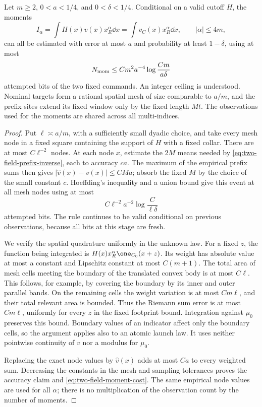 \begin{lemma}
\label{lem:two-field-finite-moments}
Let $m\ge2$, $0<a<1/4$, and $0<\delta<1/4$.  Conditional on a
valid cutoff $H$, the moments
\[
 I_\alpha=\int H(x)v(x)x_R^\alpha\dd x
          =\int v_C(x)x_R^\alpha\dd x,
                    \qquad |\alpha|\le4m,
\]
can all be estimated with error at most $a$ and probability at least
$1-\delta$, using at most
\begin{equation}\label{eq:two-field-moment-cost}
 N_{\rm mom}\le C m^2a^{-4}
                    \log\frac{Cm}{a\delta}
\end{equation}
attempted bits of the two fixed commands.  An integer ceiling is
understood.  Nominal targets form a rational spatial mesh of size
comparable to $a/m$, and the prefix sites extend its fixed window
only by the fixed length $Mt$.  The observations used for the
moments are shared across all multi-indices.
\end{lemma}
\begin{proof}
Put $\ell\asymp a/m$, with a sufficiently small dyadic choice,
and take every mesh node in a fixed square containing the support
of $H$ with a fixed collar.  There are at most $C\ell^{-2}$ nodes.
At each node $x$, estimate the $2M$ means needed by
\eqref{eq:two-field-prefix-inverse}, each to accuracy $c a$.
The maximum of the empirical prefix sums then gives
$|\widehat v(x)-v(x)|\le C M a$; absorb the fixed $M$ by the
choice of the small constant $c$.  Hoeffding's inequality and a
union bound give this event at all mesh nodes using at most
\[
 C\ell^{-2}a^{-2}\log\frac{C}{\ell\delta}
\]
attempted bits.  The rule continues to be valid conditional on
previous observations, because all bits at this stage are fresh.

We verify the spatial quadrature uniformly in the unknown law.
For a fixed $z$, the function being integrated is
$H(x)x_R^\alpha\one_{C_0}(x+z)$.  Its weight has absolute value
at most a constant and Lipschitz constant at most $C(m+1)$.
The total area of mesh cells meeting the boundary of the translated
convex body is at most $C\ell$.  This follows, for example, by
covering the boundary by its inner and outer parallel bands.
On the remaining cells the weight variation is at most $Cm\ell$,
and their total relevant area is bounded.  Thus the Riemann sum
error is at most $Cm\ell$, uniformly for every $z$ in the fixed
footprint bound.  Integration against $\mu_0$ preserves this bound.
Boundary values of an indicator affect only the boundary cells,
so the argument applies also to an atomic launch law.  It uses
neither pointwise continuity of $v$ nor a modulus for $\mu_0$.

Replacing the exact node values by $\widehat v(x)$ adds at most
$Ca$ to every weighted sum.  Decreasing the constants in the
mesh and sampling tolerances proves the accuracy claim and
\eqref{eq:two-field-moment-cost}.  The same empirical node values
are used for all $\alpha$; there is no multiplication of the
observation count by the number of moments.
\end{proof}

